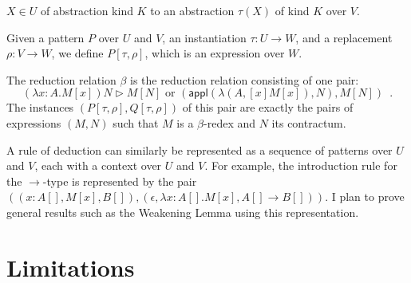 \documentclass[envcountsame]{llncs}
\newcommand{\appl}{\ensuremath{\mathsf{appl}}}
\begin{document}
\begin{definition}
\begin{enumerate}
$X \in U$ of abstraction kind $K$ to an abstraction $\tau(X)$ of kind $K$ over $V$.
\end{enumerate}
\end{definition}

Given a pattern $P$ over $U$ and $V$, an instantiation $\tau : U \rightarrow W$, and a replacement $\rho : V \rightarrow W$, we define $P[\tau, \rho]$, which is an
expression over $W$.

The reduction relation $\beta$ is the reduction relation consisting of one pair:
\[ (\lambda x:A.M[x])N \rhd M[N] \text{ or } (\appl(\lambda(A, [x] M[x]), N), M[N]) \enspace . \]
The instances $(P[\tau, \rho], Q[\tau, \rho])$ of this pair are exactly the pairs of expressions $(M, N)$ such that $M$ is a $\beta$-redex and $N$ its contractum.

A rule of deduction can similarly be represented as a sequence of patterns over $U$ and $V$, each with a context over $U$ and $V$.  For example, the introduction rule for the $\rightarrow$-type
is represented by the pair $((x : A[], M[x], B[]), (\epsilon, \lambda x:A[].M[x], A[] \rightarrow B[]))$.  I plan to prove general results such as the Weakening Lemma
using this representation.

\section{Limitations}
\end{document}
